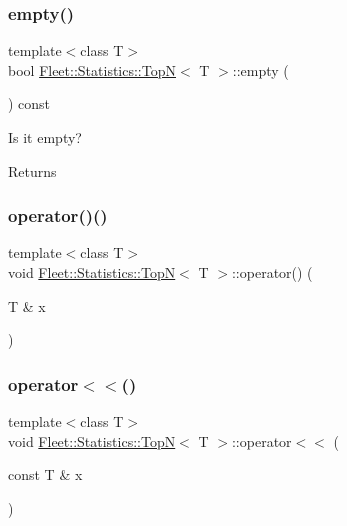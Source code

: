 \subsubsection{\texorpdfstring{empty()}{empty()}}
{\footnotesize\ttfamily template$<$class T$>$ \\
bool \hyperlink{class_fleet_1_1_statistics_1_1_top_n}{Fleet\+::\+Statistics\+::\+TopN}$<$ T $>$\+::empty (\begin{DoxyParamCaption}{ }\end{DoxyParamCaption}) const\hspace{0.3cm}{\ttfamily [inline]}}

Is it empty? \begin{DoxyReturn}{Returns}

\end{DoxyReturn}
\mbox{\label{class_fleet_1_1_statistics_1_1_top_n_a3300639fe8eef303fb66e1630dc0790c}} 
\subsubsection{\texorpdfstring{operator()()}{operator()()}}
{\footnotesize\ttfamily template$<$class T$>$ \\
void \hyperlink{class_fleet_1_1_statistics_1_1_top_n}{Fleet\+::\+Statistics\+::\+TopN}$<$ T $>$\+::operator() (\begin{DoxyParamCaption}\item[{T \&}]{x }\end{DoxyParamCaption})\hspace{0.3cm}{\ttfamily [inline]}}

\mbox{\label{class_fleet_1_1_statistics_1_1_top_n_af54651d8e83bdcc6b3ffbcef3aa3fd6e}} 
\subsubsection{\texorpdfstring{operator$<$$<$()}{operator<<()}\hspace{0.1cm}{\footnotesize\ttfamily [1/2]}}
{\footnotesize\ttfamily template$<$class T$>$ \\
void \hyperlink{class_fleet_1_1_statistics_1_1_top_n}{Fleet\+::\+Statistics\+::\+TopN}$<$ T $>$\+::operator$<$$<$ (\begin{DoxyParamCaption}\item[{const T \&}]{x }\end{DoxyParamCaption})\hspace{0.3cm}{\ttfamily [inline]}}

